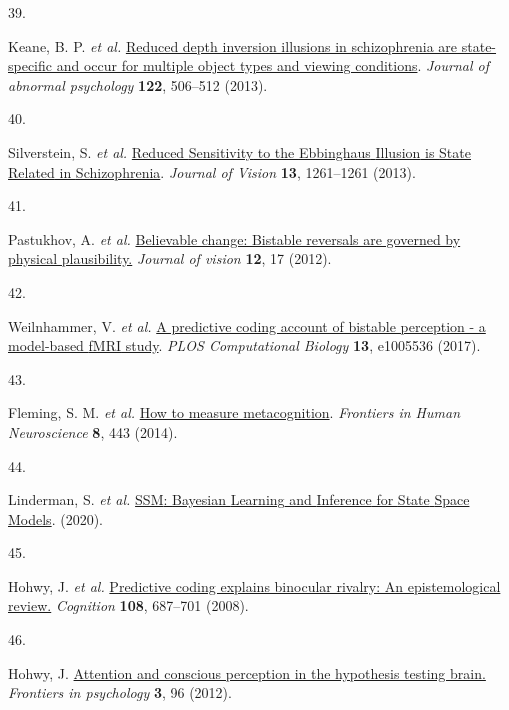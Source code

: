 \documentclass[
]{article}
\newlength{\cslhangindent}
\newlength{\csllabelwidth}
\newenvironment{CSLReferences}[2] %
 {\begin{list}{}{%
  \setlength{\itemindent}{0pt}
  \setlength{\leftmargin}{0pt}
  \setlength{\parsep}{0pt}
  \ifodd #1
   \setlength{\leftmargin}{\cslhangindent}
   \setlength{\itemindent}{-1\cslhangindent}
  \fi
  \setlength{\itemsep}{#2\baselineskip}}}
 {\end{list}}
\newcommand{\CSLLeftMargin}[1]{\parbox[t]{\csllabelwidth}{\strut#1\strut}}
\newcommand{\CSLRightInline}[1]{\parbox[t]{\linewidth - \csllabelwidth}{\strut#1\strut}}
\begin{document}
\begin{CSLReferences}{0}{0}
\CSLLeftMargin{39. }%
\CSLRightInline{Keane, B. P. \emph{et al.}
\href{https://doi.org/10.1037/a0032110}{Reduced depth inversion
illusions in schizophrenia are state-specific and occur for multiple
object types and viewing conditions}. \emph{Journal of abnormal
psychology} \textbf{122}, 506--512 (2013).}

\CSLLeftMargin{40. }%
\CSLRightInline{Silverstein, S. \emph{et al.}
\href{https://doi.org/10.1167/13.9.1261}{Reduced {Sensitivity} to the
{Ebbinghaus} {Illusion} is {State} {Related} in {Schizophrenia}}.
\emph{Journal of Vision} \textbf{13}, 1261--1261 (2013).}

\CSLLeftMargin{41. }%
\CSLRightInline{Pastukhov, A. \emph{et al.}
\href{https://doi.org/10.1167/12.1.17}{Believable change: Bistable
reversals are governed by physical plausibility.} \emph{Journal of
vision} \textbf{12}, 17 (2012).}

\CSLLeftMargin{42. }%
\CSLRightInline{Weilnhammer, V. \emph{et al.}
\href{https://doi.org/10.1371/journal.pcbi.1005536}{A predictive coding
account of bistable perception - a model-based {fMRI} study}. \emph{PLOS
Computational Biology} \textbf{13}, e1005536 (2017).}

\CSLLeftMargin{43. }%
\CSLRightInline{Fleming, S. M. \emph{et al.}
\href{https://doi.org/10.3389/fnhum.2014.00443}{How to measure
metacognition}. \emph{Frontiers in Human Neuroscience} \textbf{8}, 443
(2014).}

\CSLLeftMargin{44. }%
\CSLRightInline{Linderman, S. \emph{et al.}
\href{https://github.com/lindermanlab/ssm}{{SSM}: {Bayesian} {Learning}
and {Inference} for {State} {Space} {Models}}. (2020).}

\CSLLeftMargin{45. }%
\CSLRightInline{Hohwy, J. \emph{et al.}
\href{https://doi.org/10.1016/j.cognition.2008.05.010}{Predictive coding
explains binocular rivalry: An epistemological review.} \emph{Cognition}
\textbf{108}, 687--701 (2008).}

\CSLLeftMargin{46. }%
\CSLRightInline{Hohwy, J.
\href{https://doi.org/10.3389/fpsyg.2012.00096}{Attention and conscious
perception in the hypothesis testing brain.} \emph{Frontiers in
psychology} \textbf{3}, 96 (2012).}


\end{CSLReferences}
\end{document}
